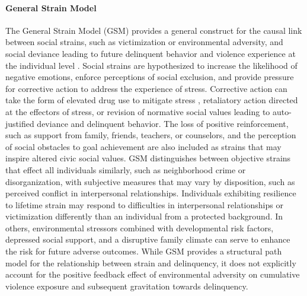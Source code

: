 \documentclass[utf8]{frontiersSCNS} %
\begin{document}
\paragraph{General Strain Model} The General Strain Model (GSM) provides a general construct for the causal link between social strains, such as victimization or environmental adversity, and social deviance leading to future delinquent behavior and violence experience at the individual level \cite{agnew2007pressure}. Social strains are hypothesized to increase the likelihood of negative emotions, enforce perceptions of social exclusion, and provide pressure for corrective action to address the experience of stress. Corrective action can take the form of elevated drug use to mitigate stress \citep{slocum2010general}, retaliatory action directed at the effectors of stress, or revision of normative social values leading to auto-justified deviance and delinquent behavior. The loss of positive reinforcement, such as support from family, friends, teachers, or counselors, and the perception of social obstacles to goal achievement are also included as strains that may inspire altered civic social values. GSM distinguishes between objective strains that effect all individuals similarly, such as neighborhood crime or disorganization, with subjective measures that may vary by disposition, such as perceived conflict in interpersonal relationships. Individuals exhibiting resilience to lifetime strain may respond to difficulties in interpersonal relationships or victimization differently than an individual from a protected background. In others, environmental stressors combined with developmental risk factors, depressed social support, and a disruptive family climate can serve to enhance the risk for future adverse outcomes. While GSM provides a structural path model for the relationship between strain and delinquency, it does not explicitly account for the positive feedback effect of environmental adversity on cumulative violence exposure and subsequent gravitation towards delinquency.
\end{document}
